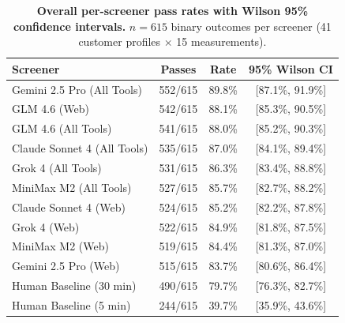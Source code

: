 \documentclass[utf8]{frontiers_suppmat}
\begin{document}
\begin{table}[H]
\centering
\caption{\textbf{Overall per-screener pass rates with Wilson 95\% confidence intervals.} $n = 615$ binary outcomes per screener (41 customer profiles $\times$ 15 measurements).}
\label{tab:wilson_overall}
\small
\begin{tabular}{lccc}
\toprule
\textbf{Screener} & \textbf{Passes} & \textbf{Rate} & \textbf{95\% Wilson CI} \\
\midrule
Gemini 2.5 Pro (All Tools) & 552/615 & 89.8\% & [87.1\%, 91.9\%] \\
GLM 4.6 (Web)              & 542/615 & 88.1\% & [85.3\%, 90.5\%] \\
GLM 4.6 (All Tools)        & 541/615 & 88.0\% & [85.2\%, 90.3\%] \\
Claude Sonnet 4 (All Tools)& 535/615 & 87.0\% & [84.1\%, 89.4\%] \\
Grok 4 (All Tools)         & 531/615 & 86.3\% & [83.4\%, 88.8\%] \\
MiniMax M2 (All Tools)     & 527/615 & 85.7\% & [82.7\%, 88.2\%] \\
Claude Sonnet 4 (Web)      & 524/615 & 85.2\% & [82.2\%, 87.8\%] \\
Grok 4 (Web)               & 522/615 & 84.9\% & [81.8\%, 87.5\%] \\
MiniMax M2 (Web)           & 519/615 & 84.4\% & [81.3\%, 87.0\%] \\
Gemini 2.5 Pro (Web)       & 515/615 & 83.7\% & [80.6\%, 86.4\%] \\
Human Baseline (30 min)    & 490/615 & 79.7\% & [76.3\%, 82.7\%] \\
Human Baseline (5 min)     & 244/615 & 39.7\% & [35.9\%, 43.6\%] \\
\bottomrule
\end{tabular}
\end{table}
\end{document}
